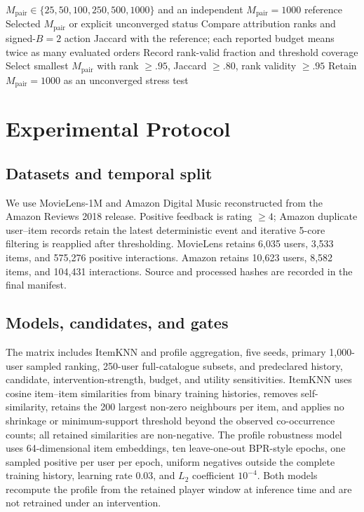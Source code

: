 \documentclass[pdflatex,sn-basic,Numbered]{sn-jnl}
\theoremstyle{thmstyleone}
\theoremstyle{thmstyletwo}
\theoremstyle{thmstylethree}
\begin{document}
\begin{algorithm}[t]
\caption{Independent convergence selection}
\label{alg:convergence}
\begin{algorithmic}[1]
\Require $M_{\mathrm{pair}}\in\{25,50,100,250,500,1000\}$ and an independent $M_{\mathrm{pair}}=1000$ reference
\Ensure Selected $M_{\mathrm{pair}}$ or explicit unconverged status
\State Compare attribution ranks and signed-$B=2$ action Jaccard with the reference; each reported budget means twice as many evaluated orders
\State Record rank-valid fraction and threshold coverage
\EndFor
\State Select smallest $M_{\mathrm{pair}}$ with rank $\ge.95$, Jaccard $\ge.80$, rank validity $\ge.95$
\State Retain $M_{\mathrm{pair}}=1000$ as an unconverged stress test\EndIf
\end{algorithmic}
\end{algorithm}

\section{Experimental Protocol}
\subsection{Datasets and temporal split}
We use MovieLens-1M \citep{harper2016,ni2019} and Amazon Digital Music reconstructed from the Amazon Reviews 2018 release. Positive feedback is rating $\ge4$; Amazon duplicate user--item records retain the latest deterministic event and iterative 5-core filtering is reapplied after thresholding. MovieLens retains 6,035 users, 3,533 items, and 575,276 positive interactions. Amazon retains 10,623 users, 8,582 items, and 104,431 interactions. Source and processed hashes are recorded in the final manifest.

\subsection{Models, candidates, and gates}
The matrix includes ItemKNN and profile aggregation, five seeds, primary 1,000-user sampled ranking, 250-user full-catalogue subsets, and predeclared history, candidate, intervention-strength, budget, and utility sensitivities. ItemKNN uses cosine item--item similarities from binary training histories, removes self-similarity, retains the 200 largest non-zero neighbours per item, and applies no shrinkage or minimum-support threshold beyond the observed co-occurrence counts; all retained similarities are non-negative. The profile robustness model uses 64-dimensional item embeddings, ten leave-one-out BPR-style epochs, one sampled positive per user per epoch, uniform negatives outside the complete training history, learning rate $0.03$, and $L_2$ coefficient $10^{-4}$. Both models recompute the profile from the retained player window at inference time and are not retrained under an intervention.
\end{document}
